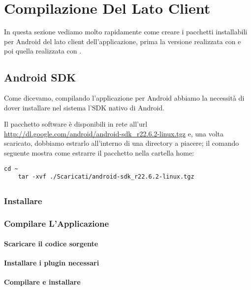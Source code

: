 \chapter{Compilazione Del Lato Client}

In questa sezione vediamo molto rapidamente come creare i pacchetti installabili
per Android del lato client dell'applicazione, prima la versione realizzata con
\pg{} e poi quella realizzata con \tisdk{}.

\section{Android SDK}
    Come dicevamo, compilando l'applicazione per Android abbiamo la necessità di
    dover installare nel sistema l'SDK nativo di Android.
    
    Il pacchetto software è disponibili in rete all'url
    \url{http://dl.google.com/android/android-sdk_r22.6.2-linux.tgz} e, una
    volta scaricato, dobbiamo estrarlo all'interno di una directory a piacere;
    il comando seguente mostra come estrarre il pacchetto nella cartella home:
    \begin{lstlisting}[language=plane]
    cd ~
    tar -xvf ./Scaricati/android-sdk_r22.6.2-linux.tgz
    \end{lstlisting}

\section{\pg{}}

    \subsection{Installare \pg{}}

    \subsection{Compilare L'Applicazione}
        \subsubsection{Scaricare il codice sorgente}
        \subsubsection{Installare i plugin necessari}
        \subsubsection{Compilare e installare}



